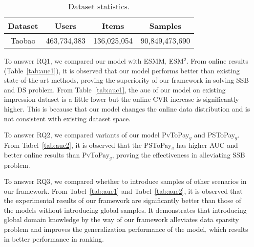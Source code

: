 \documentclass[sigconf]{acmart}
\begin{document}
\begin{table}
\centering
\caption{Dataset statistics.}
\label{tab:dataset}
\vskip -8pt
\begin{tabular}{c|c c c}
\hline
Dataset &  Users &  Items & Samples\\
\hline
Taobao & 463,734,383 & 136,025,054 & 90,849,473,690\\
\hline
\end{tabular}
\vskip -15pt
\end{table}


To answer RQ1, we compared our model with ESMM, ESM$^2$. From online results (Table~\ref{tab:auc1}), it is observed that our model performs better than existing state-of-the-art methods,  proving the superiority of our framework in solving SSB and DS problem. From Table~\ref{tab:auc1}, the auc of our model on existing impression dataset is a little lower but the online CVR increase is significantly higher. This is because that our model changes the online data distribution and is not consistent with existing dataset space. 


To answer RQ2, we compared variants of our model PvToPay$_g$ and PSToPay$_g$. From Tabel~\ref{tab:auc2}, it is observed that the PSToPay$_g$ has higher AUC and better online results than PvToPay$_g$, proving the effectiveness in alleviating SSB problem. 



To answer RQ3, we compared whether to introduce samples of other scenarios in our framework. From Tabel~\ref{tab:auc1} and Tabel~\ref{tab:auc2}, it is observed that the experimental results of our framework are significantly better than those of the models without introducing global samples. It demonstrates that introducing global domain knowledge by the way of our framework alleviates data sparsity problem and improves the generalization performance of the model, which results in better performance in ranking.


\end{document}
